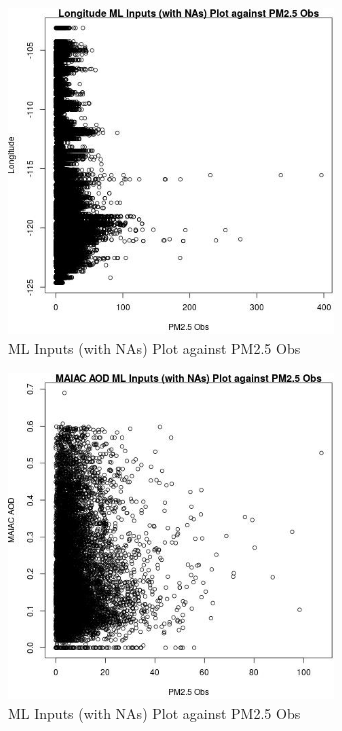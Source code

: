 \begin{figure} 
\centering  
\includegraphics[width=0.77\textwidth]{Code_Outputs/Report_ML_input_PM25_Step4_part_e_de_duplicated_aveswNAs_LongitudevPM25_Obs.jpg} 
\caption{\label{fig:Report_ML_input_PM25_Step4_part_e_de_duplicated_aveswNAsLongitudevPM25_Obs}ML Inputs (with NAs) Plot against PM2.5 Obs} 
\end{figure} 
 

\begin{figure} 
\centering  
\includegraphics[width=0.77\textwidth]{Code_Outputs/Report_ML_input_PM25_Step4_part_e_de_duplicated_aveswNAs_MAIAC_AODvPM25_Obs.jpg} 
\caption{\label{fig:Report_ML_input_PM25_Step4_part_e_de_duplicated_aveswNAsMAIAC_AODvPM25_Obs}ML Inputs (with NAs) Plot against PM2.5 Obs} 
\end{figure} 
 

